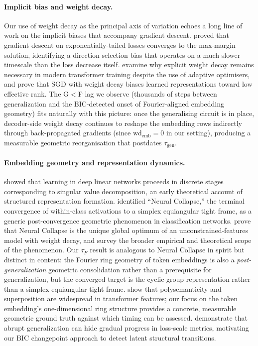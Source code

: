 \documentclass{article}
\newcommand{\taug}{\tau_{\mathrm{gen}}}
\newcommand{\tauf}{\tau_{F}}
\begin{document}
\paragraph{Implicit bias and weight decay.}
Our use of weight decay as the principal axis of variation echoes a
long line of work on the implicit biases that accompany gradient
descent.
\citet{soudry2018implicit} proved that gradient descent on
exponentially-tailed losses converges to the max-margin solution,
identifying a direction-selection bias that operates on a much slower
timescale than the loss decrease itself.
\citet{andriushchenko2023need} examine why explicit weight decay
remains necessary in modern transformer training despite the use of
adaptive optimisers, and \citet{galanti2024sgd} prove that SGD with
weight decay biases learned representations toward low effective rank.
The G$<$F lag we observe (thousands of steps between generalization
and the BIC-detected onset of Fourier-aligned embedding geometry)
fits naturally with this picture: once the generalising circuit
is in place, decoder-side weight decay continues to reshape the
embedding rows indirectly through back-propagated gradients
(since $\mathrm{wd}_{\mathrm{emb}}{=}0$ in our setting),
producing a measurable geometric reorganisation that postdates
$\taug$.

\paragraph{Embedding geometry and representation dynamics.}
\citet{saxe2014exact} showed that learning in deep linear networks
proceeds in discrete stages corresponding to singular value
decomposition, an early theoretical account of structured
representation formation.
\citet{papyan2020prevalence} identified ``Neural Collapse,'' the
terminal convergence of within-class activations to a simplex
equiangular tight frame, as a generic post-convergence geometric
phenomenon in classification networks.
\citet{zhu2021geometric} prove that Neural Collapse is the unique
global optimum of an unconstrained-features model with weight decay,
and \citet{kothapalli2023neural} survey the broader empirical and
theoretical scope of the phenomenon.
Our $\tauf$ result is analogous to Neural Collapse in spirit but
distinct in content: the Fourier ring geometry of token embeddings
is also a \emph{post-generalization} geometric consolidation rather
than a prerequisite for generalization, but the converged target is
the cyclic-group representation rather than a simplex equiangular
tight frame.
\citet{elhage2022toy} show that polysemanticity and superposition
are widespread in transformer features; our focus on the token
embedding's one-dimensional ring structure provides a concrete,
measurable geometric ground truth against which timing can be assessed.
\citet{barak2022hidden} demonstrate that abrupt generalization can
hide gradual progress in loss-scale metrics, motivating our
BIC changepoint approach to detect latent structural transitions.
\end{document}
